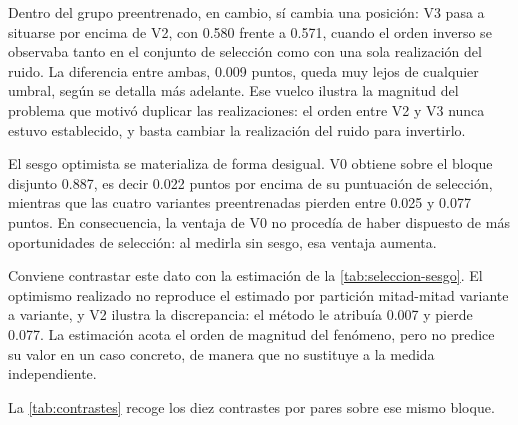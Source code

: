 Dentro del grupo preentrenado, en cambio, s\'i cambia una posici\'on: V3 pasa a situarse por
encima de V2, con \num{0.580} frente a \num{0.571}, cuando el orden inverso se observaba
tanto en el conjunto de selecci\'on como con una sola realizaci\'on del ruido. La diferencia
entre ambas, \num{0.009} puntos, queda muy lejos de cualquier umbral, seg\'un se detalla m\'as
adelante. Ese vuelco ilustra la magnitud del problema que motiv\'o duplicar las
realizaciones: el orden entre V2 y V3 nunca estuvo establecido, y basta cambiar la
realizaci\'on del ruido para invertirlo.

El sesgo optimista se materializa de forma desigual. V0 obtiene sobre el bloque disjunto
\num{0.887}, es decir \num{0.022} puntos por encima de su puntuaci\'on de selecci\'on,
mientras que las cuatro variantes preentrenadas pierden entre \num{0.025} y \num{0.077}
puntos. En consecuencia, la ventaja de V0 no proced\'ia de haber dispuesto de m\'as
oportunidades de selecci\'on: al medirla sin sesgo, esa ventaja aumenta.

Conviene contrastar este dato con la estimaci\'on de la \cref{tab:seleccion-sesgo}. El
optimismo realizado no reproduce el estimado por partici\'on mitad-mitad variante a
variante, y V2 ilustra la discrepancia: el m\'etodo le atribu\'ia \num{0.007} y pierde
\num{0.077}. La estimaci\'on acota el orden de magnitud del fen\'omeno, pero no predice su
valor en un caso concreto, de manera que no sustituye a la medida independiente.

La \cref{tab:contrastes} recoge los diez contrastes por pares sobre ese mismo bloque.

